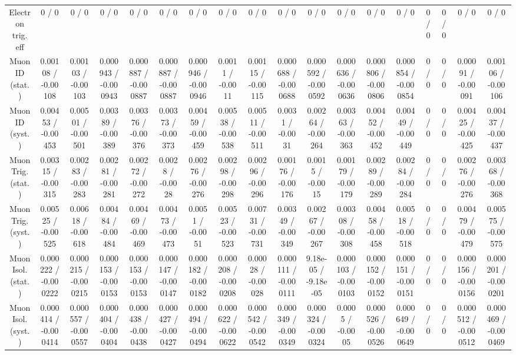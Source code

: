 \documentclass[10pt]{article}
\begin{document}
\begin{table}[htbp]
\begin{center}
\begin{tabular}{|c|c|c|c|c|c|c|c|c|c|c|c|c|c|c|c|c|c|}
  Electron trig. eff & 0 / 0 & 0 / 0 & 0 / 0 & 0 / 0 & 0 / 0 & 0 / 0 & 0 / 0 & 0 / 0 & 0 / 0 & 0 / 0 & 0 / 0 & 0 / 0 & 0 / 0 & 0 / 0 & 0 / 0 & 0 / 0 & 0 / 0 \\ 
  Muon ID (stat.) & 0.00108 / -0.00108 & 0.00103 / -0.00103 & 0.000943 / -0.000943 & 0.000887 / -0.000887 & 0.000887 / -0.000887 & 0.000946 / -0.000946 & 0.0011 / -0.0011 & 0.00115 / -0.00115 & 0.000688 / -0.000688 & 0.000592 / -0.000592 & 0.000636 / -0.000636 & 0.000806 / -0.000806 & 0.000854 / -0.000854 & 0 / 0 & 0 / 0 & 0.00091 / -0.00091 & 0.00106 / -0.00106 \\ 
  Muon ID (syst.) & 0.00453 / -0.00453 & 0.00501 / -0.00501 & 0.00389 / -0.00389 & 0.00376 / -0.00376 & 0.00373 / -0.00373 & 0.00459 / -0.00459 & 0.00538 / -0.00538 & 0.00511 / -0.00511 & 0.0031 / -0.0031 & 0.00264 / -0.00264 & 0.00363 / -0.00363 & 0.00452 / -0.00452 & 0.00449 / -0.00449 & 0 / 0 & 0 / 0 & 0.00425 / -0.00425 & 0.00437 / -0.00437 \\ 
  Muon Trig. (stat.) & 0.00315 / -0.00315 & 0.00283 / -0.00283 & 0.00281 / -0.00281 & 0.00272 / -0.00272 & 0.0028 / -0.0028 & 0.00276 / -0.00276 & 0.00298 / -0.00298 & 0.00296 / -0.00296 & 0.00176 / -0.00176 & 0.0015 / -0.0015 & 0.00179 / -0.00179 & 0.00289 / -0.00289 & 0.00284 / -0.00284 & 0 / 0 & 0 / 0 & 0.00276 / -0.00276 & 0.00368 / -0.00368 \\ 
  Muon Trig. (syst.) & 0.00525 / -0.00525 & 0.00618 / -0.00618 & 0.00484 / -0.00484 & 0.00469 / -0.00469 & 0.00473 / -0.00473 & 0.0051 / -0.0051 & 0.00523 / -0.00523 & 0.00731 / -0.00731 & 0.00349 / -0.00349 & 0.00267 / -0.00267 & 0.00308 / -0.00308 & 0.00458 / -0.00458 & 0.00518 / -0.00518 & 0 / 0 & 0 / 0 & 0.00479 / -0.00479 & 0.00575 / -0.00575 \\ 
  Muon Isol. (stat.) & 0.000222 / -0.000222 & 0.000215 / -0.000215 & 0.000153 / -0.000153 & 0.000153 / -0.000153 & 0.000147 / -0.000147 & 0.000182 / -0.000182 & 0.000208 / -0.000208 & 0.00028 / -0.00028 & 0.000111 / -0.000111 & 9.18e-05 / -9.18e-05 & 0.000103 / -0.000103 & 0.000152 / -0.000152 & 0.000151 / -0.000151 & 0 / 0 & 0 / 0 & 0.000156 / -0.000156 & 0.000201 / -0.000201 \\ 
  Muon Isol. (syst.) & 0.000414 / -0.000414 & 0.000557 / -0.000557 & 0.000404 / -0.000404 & 0.000438 / -0.000438 & 0.000427 / -0.000427 & 0.000494 / -0.000494 & 0.000622 / -0.000622 & 0.000542 / -0.000542 & 0.000349 / -0.000349 & 0.000324 / -0.000324 & 0.0005 / -0.0005 & 0.000526 / -0.000526 & 0.000649 / -0.000649 & 0 / 0 & 0 / 0 & 0.000512 / -0.000512 & 0.000469 / -0.000469 \\ 

\end{tabular}
\end{center}
\end{table}
\end{document}

